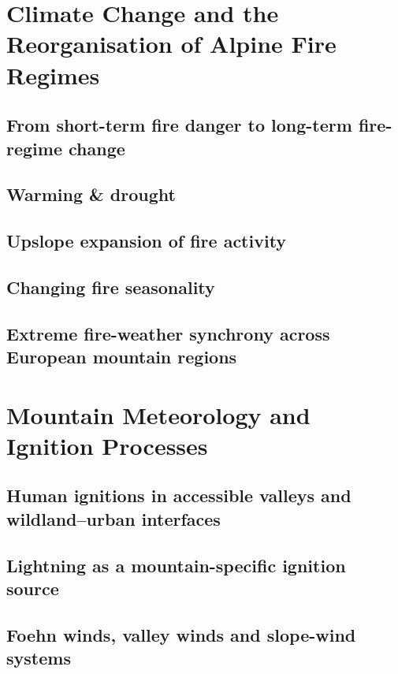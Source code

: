 \documentclass[11pt,a4paper]{article}
\begin{document}
\section{Climate Change and the Reorganisation of Alpine Fire Regimes}

\subsection{From short-term fire danger to long-term fire-regime change}

\subsection{Warming \& drought}

\subsection{Upslope expansion of fire activity}

\subsection{Changing fire seasonality}

\subsection{Extreme fire-weather synchrony across European mountain regions}


\section{Mountain Meteorology and Ignition Processes}

\subsection{Human ignitions in accessible valleys and wildland--urban interfaces}

\subsection{Lightning as a mountain-specific ignition source}

\subsection{Foehn winds, valley winds and slope-wind systems}
\end{document}
